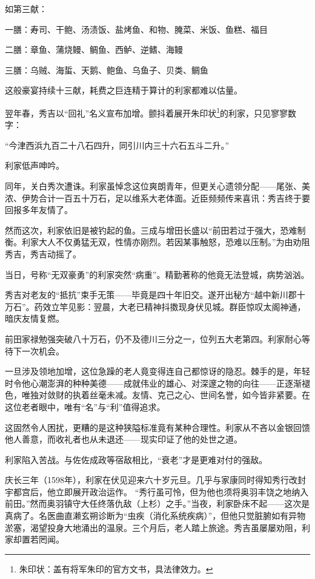 \documentclass[
]{article}
\begin{document}
如第三献：

一膳：寿司、干鲍、汤渍饭、盐烤鱼、和物、腌菜、米饭、鱼糕、福目

二膳：章鱼、蒲烧鳗、鲷鱼、西鲈、逆鳍、海鳗

三膳：乌贼、海蜇、天鹅、鲍鱼、乌鱼子、贝类、鲷鱼

这般豪宴持续十三献，耗费之巨连精于算计的利家都难以估量。

翌年春，秀吉以``回礼''名义宣布加增。颤抖着展开朱印状\footnote{朱印状：盖有将军朱印的官方文书，具法律效力。}的利家，只见寥寥数字：

``今津西浜九百二十八石四升，同引川内三十六石五斗二升。''

利家低声呻吟。

同年，关白秀次遭诛。利家虽悼念这位爽朗青年，但更关心遗领分配------尾张、美浓、伊势合计一百五十万石，足以维系大老体面。近臣频频传来喜讯：秀吉终于要回报多年友情了。

然而这次，利家依旧是被钓起的鱼。三成与增田长盛以``前田若过于强大，恐难制衡。利家大人不仅勇猛无双，性情亦刚烈。若因某事触怒，恐难以压制。''为由劝阻秀吉，秀吉动摇了。

当日，号称``无双豪勇''的利家突然``病重''。精勤著称的他竟无法登城，病势汹汹。

秀吉对老友的``抵抗''束手无策------毕竟是四十年旧交。遂开出秘方``越中新川郡十万石''。药效立竿见影：翌晨，大老已精神抖擞现身伏见城。群臣惊叹太阁神通，暗庆友情复燃。

前田家禄勉强突破八十万石，仍不及德川三分之一，位列五大老第四。利家耐心等待下一次机会。

一旦涉及领地加增，这位急躁的老人竟变得连自己都惊讶的隐忍。棘手的是，年轻时令他心潮澎湃的种种美德------成就伟业的雄心、对深邃之物的向往------正逐渐褪色，唯独对敛财的执着丝毫未减。友情、克己之心、世间名誉，如今皆非紧要。在这位老者眼中，唯有``名''与``利''值得追求。

这固然令人困扰，更糟的是这种狭隘标准竟有某种合理性。利家从不吝以金银回馈他人善意，而收礼者也从未退还------现实印证了他的处世之道。

利家陷入苦战。与佐佐成政等宿敌相比，``衰老''才是更难对付的强敌。

庆长三年（1598年），利家在伏见迎来六十岁元旦。几乎与家康同时得知秀行改封宇都宫后，他立即展开政治运作。
``秀行虽可怜，但为他也须将奥羽丰饶之地纳入前田。''然而奥羽镇守大任终落仇敌（上杉）之手。''当夜，利家卧床不起------这次是真病了。名医曲直濑玄朔诊断为``虫疾（消化系统疾病）''，但他只觉脏腑如有异物淤塞，渴望投身大地涌出的温泉。三个月后，老人踏上旅途。秀吉虽屡屡劝阻，利家却置若罔闻。
\end{document}
